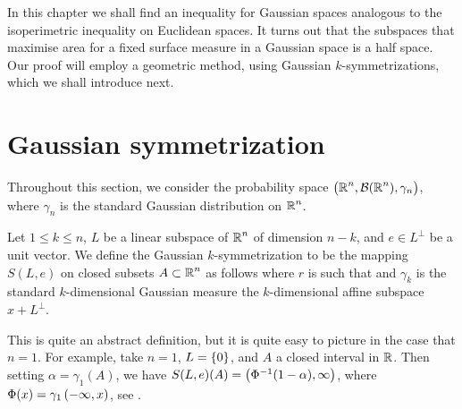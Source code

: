 \documentclass[../main.tex]{subfiles}
\begin{document}
In this chapter we shall find an inequality for Gaussian spaces analogous to the isoperimetric inequality on Euclidean spaces. It turns out that the subspaces that maximise area for a fixed surface measure in a Gaussian space is a half space. Our proof will employ a geometric method, using Gaussian $k$-symmetrizations, which we shall introduce next.

\section{Gaussian symmetrization}
Throughout this section, we consider the probability space $\del{\R^n,\Bor(\R^n),\gamma_n}$, where $\gamma_n$ is the standard Gaussian distribution on $\operatorname{\mathbb{R}}^n$.
\begin{definition}
\label{def:Gauss_symm}
Let $1\leq k\leq n$, $L$ be a linear subspace of $\operatorname{\mathbb{R}}^n$ of dimension $n-k$, and $e\in L^\perp$ be a unit vector. We define the Gaussian $k$-symmetrization to be the mapping $S(L,e)$ on closed subsets $A\subset\operatorname{\mathbb{R}}^n$ as follows  where $r$ is such that  and $\gamma_k$ is the standard $k$-dimensional Gaussian measure the $k$-dimensional affine subspace $x + L^\perp$.
\end{definition}
This is quite an abstract definition, but it is quite easy to picture in the case that $n=1$. For example, take $n=1$, $L = \cbr{0}$, and $A$ a closed interval in $\operatorname{\mathbb{R}}$. Then setting $\alpha = \gamma_1(A)$, we have $S(L,e)(A) = \intoo{\Phi^{-1}(1-\alpha),\infty}$, where $\Phi(x) = \gamma_1\intoo{-\infty,x}$, see .
\vspace{0.5cm}
\end{document}
